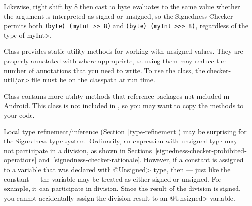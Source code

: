 Likewise, right shift by 8 then cast to byte evaluates to the
same value whether the argument is interpreted as signed or unsigned, so
the Signedness Checker permits both \verb|(byte) (myInt >> 8)| and
\verb|(byte) (myInt >>> 8)|, regardless of the type of \<myInt>.






Class  provides static
utility methods for working with unsigned values.  They are
properly annotated with 
where appropriate, so using them may reduce the number of annotations that
you need to write.
To use the  class, the
\<checker-util.jar> file must be on the classpath at run time.

Class  contains more utility
methods that reference packages not included in Android.  This class is not
included in , so you may want to copy the methods to your code.



Local type refinement/inference (Section~\ref{type-refinement}) may be
surprising for the Signedness type system.  Ordinarily, an expression with
unsigned type may not participate in a division, as shown in
Sections~\ref{signedness-checker-prohibited-operations}
and~\ref{signedness-checker-rationale}.  However, if a constant is assigned
to a variable that was declared with \<@Unsigned> type, then --- just like
the constant --- the variable may be treated as either signed or unsigned.
For example, it can participate in division.  Since the result of the
division is signed, you cannot accidentally assign the division result to
an \<@Unsigned> variable.

